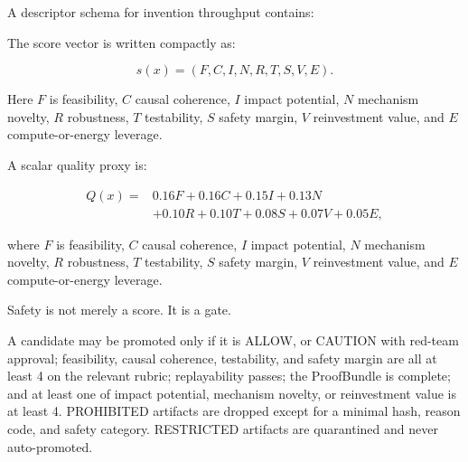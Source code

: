 A descriptor schema for invention throughput contains:

\begin{Shaded}
\begin{Highlighting}[]
\end{Highlighting}
\end{Shaded}

The score vector is written compactly as:

\[
s(x)=(F,C,I,N,R,T,S,V,E).
\]

Here \(F\) is feasibility, \(C\) causal coherence, \(I\) impact
potential, \(N\) mechanism novelty, \(R\) robustness, \(T\) testability,
\(S\) safety margin, \(V\) reinvestment value, and \(E\)
compute-or-energy leverage.

A scalar quality proxy is:

\[
\begin{aligned}
Q(x)=&
0.16F + 0.16C + 0.15I + 0.13N\\
&+0.10R + 0.10T + 0.08S + 0.07V + 0.05E,
\end{aligned}
\]

where \(F\) is feasibility, \(C\) causal coherence, \(I\) impact
potential, \(N\) mechanism novelty, \(R\) robustness, \(T\) testability,
\(S\) safety margin, \(V\) reinvestment value, and \(E\)
compute-or-energy leverage.

Safety is not merely a score. It is a gate.

\begin{Shaded}
\begin{Highlighting}[]
\end{Highlighting}
\end{Shaded}

A candidate may be promoted only if it is ALLOW, or CAUTION with
red-team approval; feasibility, causal coherence, testability, and
safety margin are all at least 4 on the relevant rubric; replayability
passes; the ProofBundle is complete; and at least one of impact
potential, mechanism novelty, or reinvestment value is at least 4.
PROHIBITED artifacts are dropped except for a minimal hash, reason code,
and safety category. RESTRICTED artifacts are quarantined and never
auto-promoted.

